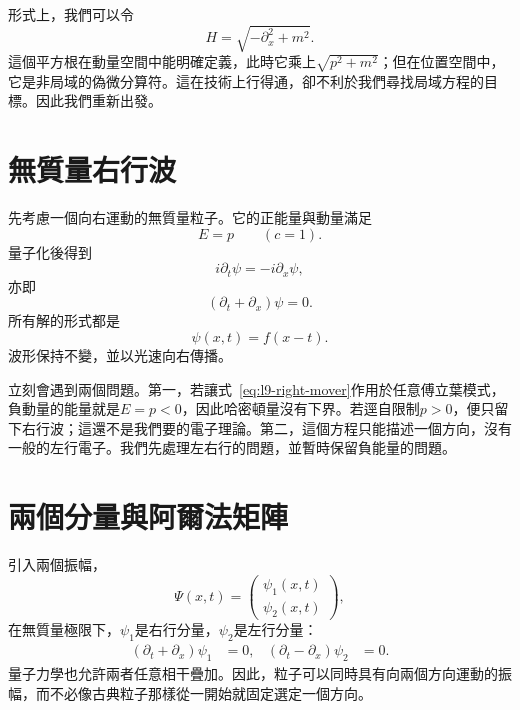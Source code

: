 形式上，我們可以令
\begin{equation}
H=\sqrt{-\partial_x^2+m^2}.
\end{equation}
這個平方根在動量空間中能明確定義，此時它乘上\(\sqrt{p^2+m^2}\)；但在位置空間中，它是非局域的偽微分算符。這在技術上行得通，卻不利於我們尋找局域方程的目標。因此我們重新出發。

\section{無質量右行波}

先考慮一個向右運動的無質量粒子。它的正能量與動量滿足
\begin{equation}
E=p
\qquad (c=1).
\end{equation}
量子化後得到
\begin{equation}
i\partial_t\psi=-i\partial_x\psi,
\end{equation}
亦即
\begin{equation}
(\partial_t+\partial_x)\psi=0.
\label{eq:l9-right-mover}
\end{equation}
所有解的形式都是
\begin{equation}
\psi(x,t)=f(x-t).
\end{equation}
波形保持不變，並以光速向右傳播。

立刻會遇到兩個問題。第一，若讓式~\eqref{eq:l9-right-mover}作用於任意傅立葉模式，負動量的能量就是\(E=p<0\)，因此哈密頓量沒有下界。若逕自限制\(p>0\)，便只留下右行波；這還不是我們要的電子理論。第二，這個方程只能描述一個方向，沒有一般的左行電子。我們先處理左右行的問題，並暫時保留負能量的問題。

\section{兩個分量與阿爾法矩陣}

引入兩個振幅，
\begin{equation}
\Psi(x,t)=
\begin{pmatrix}
\psi_1(x,t)\\[3pt]
\psi_2(x,t)
\end{pmatrix},
\end{equation}
在無質量極限下，\(\psi_1\)是右行分量，\(\psi_2\)是左行分量：
\begin{align}
(\partial_t+\partial_x)\psi_1&=0,
&
(\partial_t-\partial_x)\psi_2&=0.
\end{align}
量子力學也允許兩者任意相干疊加。因此，粒子可以同時具有向兩個方向運動的振幅，而不必像古典粒子那樣從一開始就固定選定一個方向。


